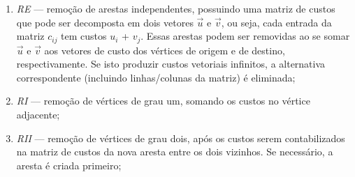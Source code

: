 \documentclass[
	12pt,				%
	openright,			%
	oneside,			%
	a4paper,			%
	tccpreliminar,			%
	]{ABNT-DC-UEL}
\begin{document}
\begin{enumerate}
    \item \textit{RE} --- remoção de arestas independentes, possuindo uma matriz de custos que pode ser decomposta em dois vetores $\Vec{u}$ e $\Vec{v}$, ou seja, cada entrada da matriz $c_{ij}$ tem custos $u_i$ + $v_j$. Essas arestas podem ser removidas ao se somar $\Vec{u}$ e $\Vec{v}$ aos vetores de custo dos vértices de origem e de destino, respectivamente. Se isto produzir custos vetoriais infinitos, a alternativa correspondente (incluindo linhas/colunas da matriz) é eliminada;

    \begin{figure}[H]
        \centering
    \end{figure}

    \item \textit{RI} --- remoção de vértices de grau um, somando os custos no vértice adjacente;

    \begin{figure}[H]
        \centering
    \end{figure}

    \item \textit{RII} --- remoção de vértices de grau dois, após os custos serem contabilizados na matriz de custos da nova aresta entre os dois vizinhos. Se necessário, a aresta é criada primeiro;


\end{enumerate}
\end{document}
